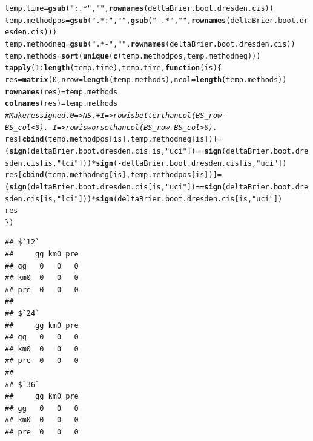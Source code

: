 \documentclass{article}\usepackage[]{graphicx}\usepackage[]{color}
\makeatletter
\newcommand{\hlnum}[1]{\textcolor[rgb]{0.686,0.059,0.569}{#1}}%
\newcommand{\hlstr}[1]{\textcolor[rgb]{0.192,0.494,0.8}{#1}}%
\newcommand{\hlcom}[1]{\textcolor[rgb]{0.678,0.584,0.686}{\textit{#1}}}%
\newcommand{\hlopt}[1]{\textcolor[rgb]{0,0,0}{#1}}%
\newcommand{\hlstd}[1]{\textcolor[rgb]{0.345,0.345,0.345}{#1}}%
\newcommand{\hlkwa}[1]{\textcolor[rgb]{0.161,0.373,0.58}{\textbf{#1}}}%
\newcommand{\hlkwb}[1]{\textcolor[rgb]{0.69,0.353,0.396}{#1}}%
\newcommand{\hlkwc}[1]{\textcolor[rgb]{0.333,0.667,0.333}{#1}}%
\newcommand{\hlkwd}[1]{\textcolor[rgb]{0.737,0.353,0.396}{\textbf{#1}}}%
\newenvironment{kframe}{%
 \def\at@end@of@kframe{}%
 \ifinner\ifhmode%
  \def\at@end@of@kframe{\end{minipage}}%
  \begin{minipage}{\columnwidth}%
 \fi\fi%
 \def\FrameCommand##1{\hskip\@totalleftmargin \hskip-\fboxsep
 \colorbox{shadecolor}{##1}\hskip-\fboxsep
     \hskip-\linewidth \hskip-\@totalleftmargin \hskip\columnwidth}%
 \MakeFramed {\advance\hsize-\width
   \@totalleftmargin\z@ \linewidth\hsize
   \@setminipage}}%
 {\par\unskip\endMakeFramed%
 \at@end@of@kframe}
\newenvironment{knitrout}{}{} %
\makeatother
\begin{document}
\begin{knitrout}
\color{fgcolor}\begin{kframe}
\begin{alltt}
\hlstd{temp.time} \hlkwb{=} \hlkwd{gsub}\hlstd{(}\hlstr{":.*"}\hlstd{,} \hlstr{""}\hlstd{,} \hlkwd{rownames}\hlstd{(deltaBrier.boot.dresden.cis))}
\hlstd{temp.methodpos} \hlkwb{=} \hlkwd{gsub}\hlstd{(}\hlstr{".*:"}\hlstd{,} \hlstr{""}\hlstd{,} \hlkwd{gsub}\hlstd{(}\hlstr{"-.*"}\hlstd{,} \hlstr{""}\hlstd{,} \hlkwd{rownames}\hlstd{(deltaBrier.boot.dresden.cis)))}
\hlstd{temp.methodneg} \hlkwb{=} \hlkwd{gsub}\hlstd{(}\hlstr{".*-"}\hlstd{,} \hlstr{""}\hlstd{,} \hlkwd{rownames}\hlstd{(deltaBrier.boot.dresden.cis))}
\hlstd{temp.methods} \hlkwb{=} \hlkwd{sort}\hlstd{(}\hlkwd{unique}\hlstd{(}\hlkwd{c}\hlstd{(temp.methodpos, temp.methodneg)))}
\hlkwd{tapply}\hlstd{(}\hlnum{1}\hlopt{:}\hlkwd{length}\hlstd{(temp.time), temp.time,} \hlkwa{function}\hlstd{(}\hlkwc{is}\hlstd{) \{}
        \hlstd{res} \hlkwb{=} \hlkwd{matrix}\hlstd{(}\hlnum{0}\hlstd{,} \hlkwc{nrow} \hlstd{=} \hlkwd{length}\hlstd{(temp.methods),} \hlkwc{ncol} \hlstd{=} \hlkwd{length}\hlstd{(temp.methods))}
        \hlkwd{rownames}\hlstd{(res)} \hlkwb{=} \hlstd{temp.methods}
        \hlkwd{colnames}\hlstd{(res)} \hlkwb{=} \hlstd{temp.methods}
        \hlcom{# Make res signed.  0 => NS.  +1 => row is better than col (BS_row - BS_col < 0).  -1 => row is worse than col (BS_row - BS_col > 0).}
        \hlstd{res[}\hlkwd{cbind}\hlstd{(temp.methodpos[is], temp.methodneg[is])]} \hlkwb{=} \hlstd{(}\hlkwd{sign}\hlstd{(deltaBrier.boot.dresden.cis[is,} \hlstr{"uci"}\hlstd{])} \hlopt{==} \hlkwd{sign}\hlstd{(deltaBrier.boot.dresden.cis[is,} \hlstr{"lci"}\hlstd{]))} \hlopt{*} \hlkwd{sign}\hlstd{(}\hlopt{-}\hlstd{deltaBrier.boot.dresden.cis[is,} \hlstr{"uci"}\hlstd{])}
        \hlstd{res[}\hlkwd{cbind}\hlstd{(temp.methodneg[is], temp.methodpos[is])]} \hlkwb{=} \hlstd{(}\hlkwd{sign}\hlstd{(deltaBrier.boot.dresden.cis[is,} \hlstr{"uci"}\hlstd{])} \hlopt{==} \hlkwd{sign}\hlstd{(deltaBrier.boot.dresden.cis[is,} \hlstr{"lci"}\hlstd{]))} \hlopt{*} \hlkwd{sign}\hlstd{(deltaBrier.boot.dresden.cis[is,} \hlstr{"uci"}\hlstd{])}
        \hlstd{res}
\hlstd{\})}
\end{alltt}
\begin{verbatim}
## $`12`
##     gg km0 pre
## gg   0   0   0
## km0  0   0   0
## pre  0   0   0
## 
## $`24`
##     gg km0 pre
## gg   0   0   0
## km0  0   0   0
## pre  0   0   0
## 
## $`36`
##     gg km0 pre
## gg   0   0   0
## km0  0   0   0
## pre  0   0   0
\end{verbatim}
\end{kframe}
\end{knitrout}
\end{document}
